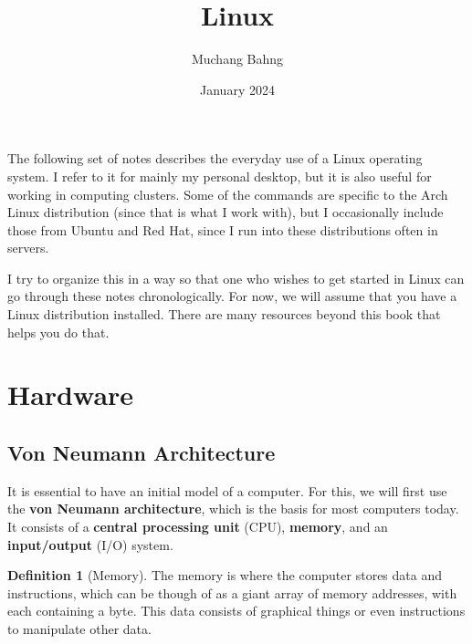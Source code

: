 \documentclass{article}
\theoremstyle{definition}
\newtheorem{definition}{Definition}[section]
\begin{document}
\pagestyle{fancy}

\cfoot{\thepage / \pageref{LastPage}}

\title{Linux}
\author{Muchang Bahng}
\date{January 2024}

\maketitle

\tableofcontents

\pagebreak 

The following set of notes describes the everyday use of a Linux operating system. I refer to it for mainly my personal desktop, but it is also useful for working in computing clusters. Some of the commands are specific to the Arch Linux distribution (since that is what I work with), but I occasionally include those from Ubuntu and Red Hat, since I run into these distributions often in servers. 

I try to organize this in a way so that one who wishes to get started in Linux can go through these notes chronologically. For now, we will assume that you have a Linux distribution installed. There are many resources beyond this book that helps you do that. 
 
\section{Hardware} 

  \subsection{Von Neumann Architecture}

    It is essential to have an initial model of a computer. For this, we will first use the \textbf{von Neumann architecture}, which is the basis for most computers today. It consists of a \textbf{central processing unit} (CPU), \textbf{memory}, and an \textbf{input/output} (I/O) system.

    \begin{definition}[Memory]
      The memory is where the computer stores data and instructions, which can be though of as a giant array of memory addresses, with each containing a byte. This data consists of graphical things or even instructions to manipulate other data.
    \end{definition}
\end{document}
